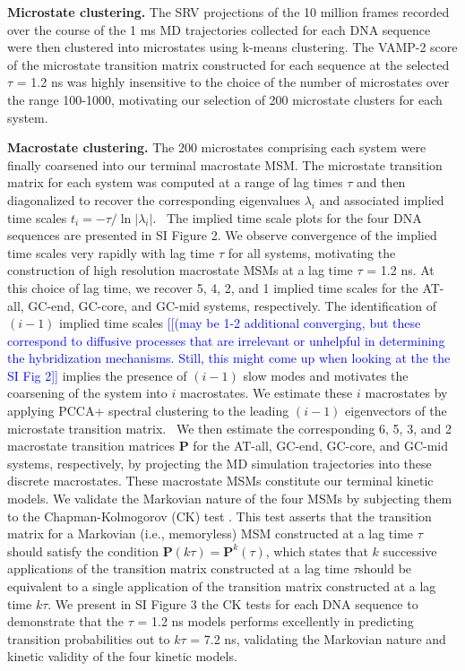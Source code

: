 \documentclass[journal=jpcbfk,manuscript=article]{achemso}
\newcommand*{\noteb}[1]{\textcolor{blue}{[[#1]]}}		%
\begin{document}
\textbf{Microstate clustering.} The SRV projections of the 10 million frames recorded over the course of the 1 ms MD trajectories collected for each DNA sequence were then clustered into microstates using k-means clustering. The VAMP-2 score of the microstate transition matrix constructed for each sequence at the selected $\tau$ = 1.2 ns was highly insensitive to the choice of the number of microstates over the range 100-1000, motivating our selection of 200 microstate clusters for each system.

\textbf{Macrostate clustering.} The 200 microstates comprising each system were finally coarsened into our terminal macrostate MSM. The microstate transition matrix for each system was computed at a range of lag times $\tau$ and then diagonalized to recover the corresponding eigenvalues $\lambda_i$ and associated implied time scales $t_i = -\tau / \ln \left| \lambda_i \right|$.~\citep{Wehmeyer2019IntroductionV1.0} The implied time scale plots for the four DNA sequences are presented in SI Figure 2. We observe convergence of the implied time scales very rapidly with lag time $\tau$ for all systems, motivating the construction of high resolution macrostate MSMs at a lag time $\tau$ = 1.2 ns. At this choice of lag time, we recover 5, 4, 2, and 1 implied time scales for the AT-all, GC-end, GC-core, and GC-mid systems, respectively. The identification of $(i-1)$ implied time scales \noteb{(may be 1-2 additional converging, but these correspond to diffusive processes that are irrelevant or unhelpful in determining the hybridization mechanisms. Still, this might come up when looking at the the SI Fig 2} implies the presence of $(i-1)$ slow modes and motivates the coarsening of the system into $i$ macrostates. We estimate these $i$ macrostates by applying PCCA+ spectral clustering to the leading $(i-1)$ eigenvectors of the microstate transition matrix.~\citep{Roblitz2013FuzzyClassification, Weber2018ImplicationsSimulation, Kube2007AConformations} We then estimate the corresponding 6, 5, 3, and 2 macrostate transition matrices $\mathbf{P}$ for the AT-all, GC-end, GC-core, and GC-mid systems, respectively, by projecting the MD simulation trajectories into these discrete macrostates. These macrostate MSMs constitute our terminal kinetic models. We validate the Markovian nature of the four MSMs by subjecting them to the Chapman-Kolmogorov (CK) test \citep{Noe2009ConstructingSimulations,Phys2011MarkovValidation,  Wehmeyer2019IntroductionV1.0}. This test asserts that the transition matrix for a Markovian (i.e., memoryless) MSM constructed at a lag time $\tau$ should satisfy the condition $\mathbf{P}(k \tau) = \mathbf{P}^k(\tau)$, which states that $k$ successive applications of the transition matrix constructed at a lag time $\tau$should be equivalent to a single application of the transition matrix constructed at a lag time $k \tau$. We present in SI Figure 3 the CK tests for each DNA sequence to demonstrate that the $\tau$ = 1.2 ns models performs excellently in predicting transition probabilities out to $k \tau$ = 7.2 ns, validating the Markovian nature and kinetic validity of the four kinetic models.
\end{document}
